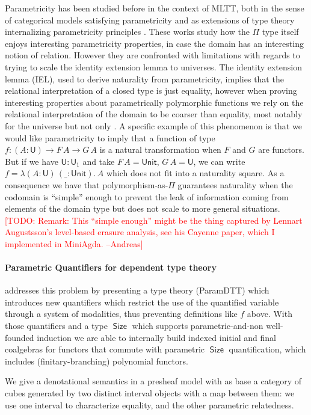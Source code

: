 \documentclass{book}
\newcommand{\TODO}[1]{\textcolor{red}{[TODO: #1]}}
\DeclareMathOperator{\Size}{\mathsf{Size}}
\newcommand{\U}{\mathsf{U}}
\newcommand{\sd}{.\,}
\begin{document}
Parametricity has been studied before in the context of MLTT,
both in the sense of categorical models satisfying parametricity
\cite{atkeyGhaniJohann:popl14} and as extensions of type theory
internalizing parametricity principles \cite{moulin:mfps15}.
These works study how the $\Pi$ type itself enjoys interesting
parametricity properties, in case the domain has an interesting notion
of relation. However they are confronted with limitations with regards
to trying to scale the identity extension lemma to universes.
The identity extension lemma (IEL)\cite{reynolds:ifip83}, used to derive naturality from
parametricity, implies that the relational interpretation of a closed
type is just equality, however when proving interesting properties
about parametrically polymorphic functions we rely on the relational
interpretation of the domain to be coarser than equality, most notably
for the universe but not only \cite{atkey:algebraic-indexed}.
A specific example of this phenomenon is that we would like
parametricity to imply that a function of type $f : (A : \U) \to F\,A
\to G\,A$ is a natural transformation when $F$ and $G$ are
functors. But if we have $\U : \U_1$ and take $F\,A = \mathsf{Unit}$,
$G\,A = \U$, we can write $f = \lambda (A : \U)\, (\_ :
\mathsf{Unit})\sd A$ which does not fit into a naturality square.
As a consequence we have that polymorphism-as-$\Pi$ guarantees
naturality when the codomain is ``simple'' enough to prevent the leak
of information coming from elements of the domain type but does not
scale to more general situations.
\TODO{Remark: This ``simple enough'' might be the thing captured by
  Lennart Augustsson's level-based erasure analysis, see his Cayenne
  paper, which I implemented in MiniAgda. --Andreas}

\paragraph{Parametric Quantifiers for dependent type theory}
addresses this problem by presenting a type theory (ParamDTT) which
introduces new quantifiers which restrict the use of the quantified
variable through a system of modalities, thus preventing definitions
like $f$ above.  With those quantifiers and a type $\Size$ which
supports parametric-and-non well-founded induction we are able to
internally build indexed initial and final coalgebras for functors
that commute with parametric $\Size$ quantification, which includes
(finitary-branching) polynomial functors.

We give a denotational semantics in a presheaf model with as base a category
of cubes generated by two distinct interval objects with a map between
them: we use one interval to characterize equality, and the other parametric
relatedness.
\end{document}
